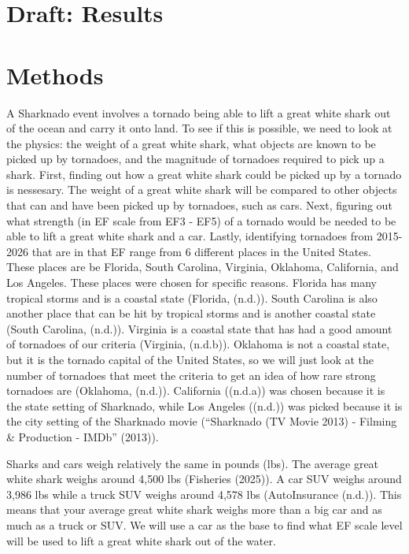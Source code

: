 \documentclass[
  letterpaper,
  DIV=11,
  numbers=noendperiod]{scrreprt}
\begin{document}
\chapter{Draft: Results}\label{draft-results}

\chapter{Methods}\label{methods-2}

A Sharknado event involves a tornado being able to lift a great white
shark out of the ocean and carry it onto land. To see if this is
possible, we need to look at the physics: the weight of a great white
shark, what objects are known to be picked up by tornadoes, and the
magnitude of tornadoes required to pick up a shark. First, finding out
how a great white shark could be picked up by a tornado is nessesary.
The weight of a great white shark will be compared to other objects that
can and have been picked up by tornadoes, such as cars. Next, figuring
out what strength (in EF scale from EF3 - EF5) of a tornado would be
needed to be able to lift a great white shark and a car. Lastly,
identifying tornadoes from 2015-2026 that are in that EF range from 6
different places in the United States. These places are be Florida,
South Carolina, Virginia, Oklahoma, California, and Los Angeles. These
places were chosen for specific reasons. Florida has many tropical
storms and is a coastal state (Florida, (n.d.)). South Carolina is also
another place that can be hit by tropical storms and is another coastal
state (South Carolina, (n.d.)). Virginia is a coastal state that has had
a good amount of tornadoes of our criteria (Virginia, (n.d.b)). Oklahoma
is not a coastal state, but it is the tornado capital of the United
States, so we will just look at the number of tornadoes that meet the
criteria to get an idea of how rare strong tornadoes are (Oklahoma,
(n.d.)). California ((n.d.a)) was chosen because it is the state setting
of Sharknado, while Los Angeles ((n.d.)) was picked because it is the
city setting of the Sharknado movie ({``Sharknado ({TV} Movie 2013) -
Filming \& Production - {IMDb}''} (2013)).

Sharks and cars weigh relatively the same in pounds (lbs). The average
great white shark weighs around 4,500 lbs (Fisheries (2025)). A car SUV
weighs around 3,986 lbs while a truck SUV weighs around 4,578 lbs
(AutoInsurance (n.d.)). This means that your average great white shark
weighs more than a big car and as much as a truck or SUV. We will use a
car as the base to find what EF scale level will be used to lift a great
white shark out of the water.
\end{document}
